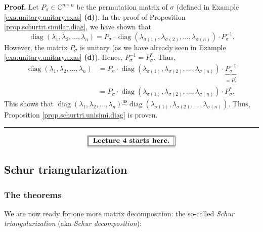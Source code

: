 \documentclass[numbers=enddot,12pt,final,onecolumn,notitlepage]{scrartcl}%
\numberwithin{exer}{subsection}
\theoremstyle{definition}
\newenvironment{proof}[1][Proof]{\noindent\textbf{#1.} }{\ \rule{0.5em}{0.5em}}
\begin{document}
\begin{proof}
Let $P_{\sigma}\in\mathbb{C}^{n\times n}$ be the permutation matrix of
$\sigma$ (defined in Example \ref{exa.unitary.unitary.exas} \textbf{(d)}). In
the proof of Proposition \ref{prop.schurtri.similar.diag}, we have shown that
\[
\operatorname*{diag}\left(  \lambda_{1},\lambda_{2},\ldots,\lambda_{n}\right)
=P_{\sigma}\cdot\operatorname*{diag}\left(  \lambda_{\sigma\left(  1\right)
},\lambda_{\sigma\left(  2\right)  },\ldots,\lambda_{\sigma\left(  n\right)
}\right)  \cdot P_{\sigma}^{-1}.
\]
However, the matrix $P_{\sigma}$ is unitary (as we have already seen in
Example \ref{exa.unitary.unitary.exas} \textbf{(d)}). Hence, $P_{\sigma}%
^{-1}=P_{\sigma}^{\ast}$. Thus,%
\begin{align*}
\operatorname*{diag}\left(  \lambda_{1},\lambda_{2},\ldots,\lambda_{n}\right)
&  =P_{\sigma}\cdot\operatorname*{diag}\left(  \lambda_{\sigma\left(
1\right)  },\lambda_{\sigma\left(  2\right)  },\ldots,\lambda_{\sigma\left(
n\right)  }\right)  \cdot\underbrace{P_{\sigma}^{-1}}_{=P_{\sigma}^{\ast}}\\
&  =P_{\sigma}\cdot\operatorname*{diag}\left(  \lambda_{\sigma\left(
1\right)  },\lambda_{\sigma\left(  2\right)  },\ldots,\lambda_{\sigma\left(
n\right)  }\right)  \cdot P_{\sigma}^{\ast}.
\end{align*}
This shows that $\operatorname*{diag}\left(  \lambda_{1},\lambda_{2}%
,\ldots,\lambda_{n}\right)  \overset{\operatorname*{us}}{\sim}%
\operatorname*{diag}\left(  \lambda_{\sigma\left(  1\right)  },\lambda
_{\sigma\left(  2\right)  },\ldots,\lambda_{\sigma\left(  n\right)  }\right)
$. Thus, Proposition \ref{prop.schurtri.unisimi.diag} is proven.
\end{proof}

%

\[%
\begin{tabular}
[c]{||l||}\hline\hline
\textbf{Lecture 4 starts here.}\\\hline\hline
\end{tabular}
\]


\subsection{Schur triangularization}

\subsubsection{The theorems}

We are now ready for one more matrix decomposition: the so-called \emph{Schur
triangularization} (aka \emph{Schur decomposition}):
\end{document}
